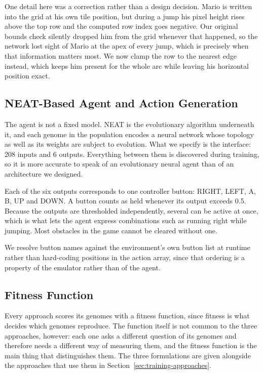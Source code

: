 \noindent
One detail here was a correction rather than a design decision. Mario is
written into the grid at his own tile position, but during a jump his pixel
height rises above the top row and the computed row index goes negative. Our
original bounds check silently dropped him from the grid whenever that
happened, so the network lost sight of Mario at the apex of every jump, which
is precisely when that information matters most. We now clamp the row to the
nearest edge instead, which keeps him present for the whole arc while leaving
his horizontal position exact.

\subsection{NEAT-Based Agent and Action Generation}
\label{subsec:neat-agent}

The agent is not a fixed model. NEAT is the evolutionary algorithm underneath
it, and each genome in the population encodes a neural network whose topology
as well as its weights are subject to evolution. What we specify is the
interface: 208 inputs and 6 outputs. Everything between them is discovered
during training, so it is more accurate to speak of an evolutionary neural
agent than of an architecture we designed.

\noindent
Each of the six outputs corresponds to one controller button: RIGHT, LEFT, A,
B, UP and DOWN. A button counts as held whenever its output exceeds 0.5.
Because the outputs are thresholded independently, several can be active at
once, which is what lets the agent express combinations such as running right
while jumping. Most obstacles in the game cannot be cleared without one.

\noindent
We resolve button names against the environment's own button list at runtime
rather than hard-coding positions in the action array, since that ordering is a
property of the emulator rather than of the agent.

\subsection{Fitness Function}
\label{subsec:fitness}

Every approach scores its genomes with a fitness function, since fitness is
what decides which genomes reproduce. The function itself is not common to the
three approaches, however: each one asks a different question of its genomes
and therefore needs a different way of measuring them, and the fitness function
is the main thing that distinguishes them. The three formulations are given
alongside the approaches that use them in
Section~\ref{sec:training-approaches}.


